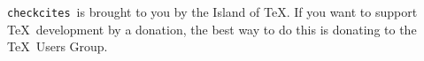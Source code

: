 \documentclass[12pt,article,a4paper,oneside]{memoir}
\title{\checkcites}
\author{Island of \TeX}
\date{Version \checkcitesversion\ -- \today}
\newcommand{\checkcites}{\texttt{checkcites}}
\begin{document}
\maketitle

\checkcites\ is brought to you by the Island of \TeX. If you want to support
\TeX\ development by a donation, the best way to do this is donating to the
\TeX\ Users Group.
\end{document}
